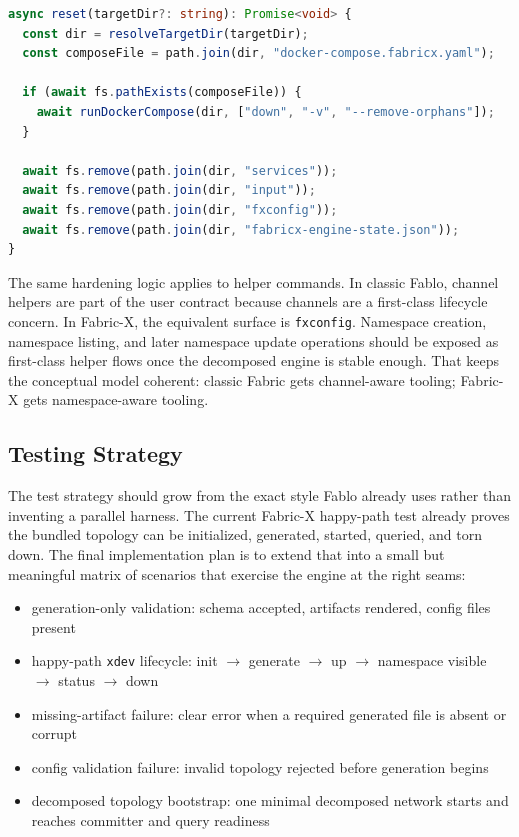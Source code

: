 \begin{tcolorbox}[colback=gray!5!white, colframe=gray!50!black,
  title=Planned Fabric-X reset flow,
  fonttitle=\bfseries, arc=4pt]
\begin{lstlisting}[language=typescript, basicstyle=\ttfamily\small]
async reset(targetDir?: string): Promise<void> {
  const dir = resolveTargetDir(targetDir);
  const composeFile = path.join(dir, "docker-compose.fabricx.yaml");

  if (await fs.pathExists(composeFile)) {
    await runDockerCompose(dir, ["down", "-v", "--remove-orphans"]);
  }

  await fs.remove(path.join(dir, "services"));
  await fs.remove(path.join(dir, "input"));
  await fs.remove(path.join(dir, "fxconfig"));
  await fs.remove(path.join(dir, "fabricx-engine-state.json"));
}
\end{lstlisting}
\end{tcolorbox}

The same hardening logic applies to helper commands. In classic Fablo, channel helpers are part of the user contract because channels are a first-class lifecycle concern. In Fabric-X, the equivalent surface is \texttt{fxconfig}. Namespace creation, namespace listing, and later namespace update operations should be exposed as first-class helper flows once the decomposed engine is stable enough. That keeps the conceptual model coherent: classic Fabric gets channel-aware tooling; Fabric-X gets namespace-aware tooling.

\subsection{Testing Strategy}

The test strategy should grow from the exact style Fablo already uses rather than inventing a parallel harness. The current Fabric-X happy-path test already proves the bundled topology can be initialized, generated, started, queried, and torn down. The final implementation plan is to extend that into a small but meaningful matrix of scenarios that exercise the engine at the right seams:
\begin{itemize}[leftmargin=*]
  \item generation-only validation: schema accepted, artifacts rendered, config files present
  \item happy-path \texttt{xdev} lifecycle: init $\rightarrow$ generate $\rightarrow$ up $\rightarrow$ namespace visible $\rightarrow$ status $\rightarrow$ down
  \item missing-artifact failure: clear error when a required generated file is absent or corrupt
  \item config validation failure: invalid topology rejected before generation begins
  \item decomposed topology bootstrap: one minimal decomposed network starts and reaches committer and query readiness
\end{itemize}

